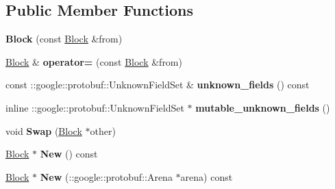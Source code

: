 \subsection*{Public Member Functions}
\begin{DoxyCompactItemize}
\item 
\hypertarget{classstruct_definitions_1_1_block_acf24077a99e7a711a58574677f5a92af}{}\label{classstruct_definitions_1_1_block_acf24077a99e7a711a58574677f5a92af} 
{\bfseries Block} (const \hyperlink{classstruct_definitions_1_1_block}{Block} \&from)
\item 
\hypertarget{classstruct_definitions_1_1_block_a1f9ba43078c373d66ebf952da7fe02f2}{}\label{classstruct_definitions_1_1_block_a1f9ba43078c373d66ebf952da7fe02f2} 
\hyperlink{classstruct_definitions_1_1_block}{Block} \& {\bfseries operator=} (const \hyperlink{classstruct_definitions_1_1_block}{Block} \&from)
\item 
\hypertarget{classstruct_definitions_1_1_block_a73a37b61d75757447aa93c963d701a7c}{}\label{classstruct_definitions_1_1_block_a73a37b61d75757447aa93c963d701a7c} 
const \+::google\+::protobuf\+::\+Unknown\+Field\+Set \& {\bfseries unknown\+\_\+fields} () const
\item 
\hypertarget{classstruct_definitions_1_1_block_ade451ae9f652b6d2f114d33391d18dc9}{}\label{classstruct_definitions_1_1_block_ade451ae9f652b6d2f114d33391d18dc9} 
inline \+::google\+::protobuf\+::\+Unknown\+Field\+Set $\ast$ {\bfseries mutable\+\_\+unknown\+\_\+fields} ()
\item 
\hypertarget{classstruct_definitions_1_1_block_ab0e3eb670515d3762f8badcf470a72a1}{}\label{classstruct_definitions_1_1_block_ab0e3eb670515d3762f8badcf470a72a1} 
void {\bfseries Swap} (\hyperlink{classstruct_definitions_1_1_block}{Block} $\ast$other)
\item 
\hypertarget{classstruct_definitions_1_1_block_aa58972a3f034f4aa7c5fcc21684ead35}{}\label{classstruct_definitions_1_1_block_aa58972a3f034f4aa7c5fcc21684ead35} 
\hyperlink{classstruct_definitions_1_1_block}{Block} $\ast$ {\bfseries New} () const
\item 
\hypertarget{classstruct_definitions_1_1_block_af4b0aa02fa3ddc7eea9616f886cea7ca}{}\label{classstruct_definitions_1_1_block_af4b0aa02fa3ddc7eea9616f886cea7ca} 
\hyperlink{classstruct_definitions_1_1_block}{Block} $\ast$ {\bfseries New} (\+::google\+::protobuf\+::\+Arena $\ast$arena) const
\item 
\hypertarget{classstruct_definitions_1_1_block_a59fa7f19fe52df8e4bc5ae039f1b78b6}{}\label{classstruct_definitions_1_1_block_a59fa7f19fe52df8e4bc5ae039f1b78b6} 

\end{DoxyCompactItemize}
